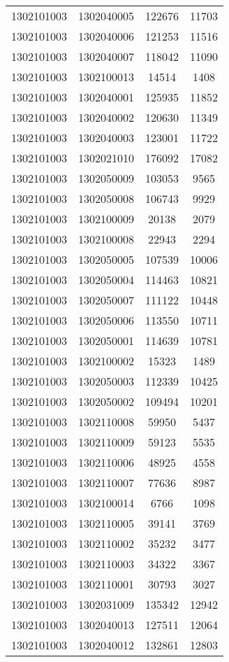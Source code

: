 \begin{longtable}{llcc}
1302101003 & 1302040005 & 122676 & 11703\\
1302101003 & 1302040006 & 121253 & 11516\\
1302101003 & 1302040007 & 118042 & 11090\\
1302101003 & 1302100013 & 14514 & 1408\\
1302101003 & 1302040001 & 125935 & 11852\\
1302101003 & 1302040002 & 120630 & 11349\\
1302101003 & 1302040003 & 123001 & 11722\\
1302101003 & 1302021010 & 176092 & 17082\\
1302101003 & 1302050009 & 103053 & 9565\\
1302101003 & 1302050008 & 106743 & 9929\\
1302101003 & 1302100009 & 20138 & 2079\\
1302101003 & 1302100008 & 22943 & 2294\\
1302101003 & 1302050005 & 107539 & 10006\\
1302101003 & 1302050004 & 114463 & 10821\\
1302101003 & 1302050007 & 111122 & 10448\\
1302101003 & 1302050006 & 113550 & 10711\\
1302101003 & 1302050001 & 114639 & 10781\\
1302101003 & 1302100002 & 15323 & 1489\\
1302101003 & 1302050003 & 112339 & 10425\\
1302101003 & 1302050002 & 109494 & 10201\\
1302101003 & 1302110008 & 59950 & 5437\\
1302101003 & 1302110009 & 59123 & 5535\\
1302101003 & 1302110006 & 48925 & 4558\\
1302101003 & 1302110007 & 77636 & 8987\\
1302101003 & 1302100014 & 6766 & 1098\\
1302101003 & 1302110005 & 39141 & 3769\\
1302101003 & 1302110002 & 35232 & 3477\\
1302101003 & 1302110003 & 34322 & 3367\\
1302101003 & 1302110001 & 30793 & 3027\\
1302101003 & 1302031009 & 135342 & 12942\\
1302101003 & 1302040013 & 127511 & 12064\\
1302101003 & 1302040012 & 132861 & 12803\\

\end{longtable}
